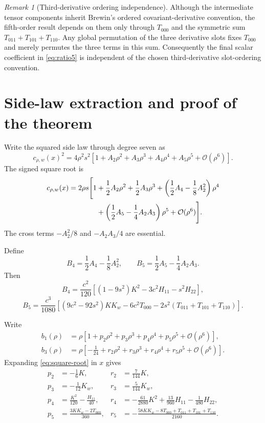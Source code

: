 \documentclass[11pt]{amsart}
\numberwithin{equation}{section}
\theoremstyle{remark}
\newtheorem{remark}[theorem]{Remark}
\newcommand{\bigO}{\mathcal{O}}
\begin{document}
\begin{remark}[Third-derivative ordering independence]\label{rem:ordering}
Although the intermediate tensor components inherit Brewin's ordered covariant-derivative convention, the fifth-order result depends on them only through $T_{000}$ and the symmetric sum $T_{011}+T_{101}+T_{110}$.  Any global permutation of the three derivative slots fixes $T_{000}$ and merely permutes the three terms in this sum.  Consequently the final scalar coefficient in \eqref{eq:ratio5} is independent of the chosen third-derivative slot-ordering convention.
\end{remark}

\section{Side-law extraction and proof of the theorem}\label{sec:side}

Write the squared side law through degree seven as
\begin{equation}\label{eq:full-square}
 c_{\rho,w}(x)^2=4\rho^2s^2
 \left[1+A_2\rho^2+A_3\rho^3+A_4\rho^4+A_5\rho^5+\bigO(\rho^6)\right].
\end{equation}
The signed square root is
\begin{align}
 c_{\rho,w}(x)=2\rho s\Bigg[1
 &+\frac12A_2\rho^2+\frac12A_3\rho^3
 +\left(\frac12A_4-\frac18A_2^2\right)\rho^4\notag\\
 &+\left(\frac12A_5-\frac14A_2A_3\right)\rho^5
 +\bigO(\rho^6)\Bigg].
\label{eq:square-root}
\end{align}
The cross terms $-A_2^2/8$ and $-A_2A_3/4$ are essential.

Define
\[
 B_4=\frac12A_4-\frac18A_2^2,
 \qquad
 B_5=\frac12A_5-\frac14A_2A_3.
\]
Then
\begin{equation}\label{eq:B4}
 B_4=\frac{c^2}{120}
 \left[(1-9s^2)K^2-3c^2H_{11}-s^2H_{22}\right],
\end{equation}
\begin{equation}\label{eq:B5}
 B_5=\frac{c^3}{1080}
 \left[(9c^2-92s^2)KK_w-6c^2T_{000}
 -2s^2(T_{011}+T_{101}+T_{110})\right].
\end{equation}

Write
\begin{align*}
 b_1(\rho)&=\rho\left[1+p_2\rho^2+p_3\rho^3+p_4\rho^4+p_5\rho^5+\bigO(\rho^6)\right],\\
 b_3(\rho)&=\rho\left[-\frac1{24}+r_2\rho^2+r_3\rho^3+r_4\rho^4+r_5\rho^5+\bigO(\rho^6)\right].
\end{align*}
Expanding \eqref{eq:square-root} in $x$ gives
\begin{align}
p_2&=-\frac16K,
& r_2&=\frac7{144}K,\label{eq:p2r2}\\
p_3&=-\frac1{12}K_w,
& r_3&=\frac5{144}K_w,\label{eq:p3r3}\\
p_4&=\frac{K^2}{120}-\frac{H_{11}}{40},
& r_4&=-\frac{61}{2880}K^2+\frac{13}{960}H_{11}-\frac1{480}H_{22},\label{eq:p4r4}\\
p_5&=\frac{3KK_w-2T_{000}}{360},
& r_5&=-\frac{58KK_w-8T_{000}+T_{011}+T_{101}+T_{110}}{2160}.
\label{eq:p5r5}
\end{align}
\end{document}
